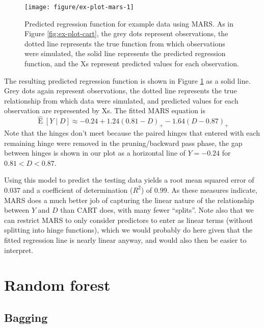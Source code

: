 \documentclass[12pt]{article}
\begin{document}
\begin{figure}[!htbp]

{\centering \texttt{[image: figure/ex-plot-mars-1]} 

}

\caption{Predicted regression function for example data using MARS. As in Figure \ref{fig:ex-plot-cart}, the grey dots represent observations, the dotted line represents the true function from which observations were simulated, the solid line represents the predicted regression function, and the Xs represent predicted values for each observation.}\label{fig:ex-plot-mars}
\end{figure}


The resulting predicted regression function is shown in Figure \ref{fig:ex-plot-mars} as a solid line. Grey dots again represent observations, the dotted line represents the true relationship from which data were simulated, and predicted values for each observation are represented by Xs. The fitted MARS equation is
\begin{equation}
  \label{eq:mars-eqn}
  \hat{\operatorname{E}}[Y \mid D] \approx -0.24 + 1.24 (0.81 - D)_{+} -1.64 (D - 0.87)_{+}
\end{equation}
Note that the hinges don't meet because the paired hinges that entered with each remaining hinge were removed in the pruning/backward pass phase, the gap between hinges is shown in our plot as a horizontal line of $Y = -0.24$ for $0.81 < D < 0.87$.

Using this model to predict the testing data yields a root mean squared error of 0.037 and a coefficient of determination ($R^2$) of 0.99. As these measures indicate, MARS does a much better job of capturing the linear nature of the relationship between $Y$ and $D$ than CART does, with many fewer ``splits''. Note also that we can restrict MARS to only consider predictors to enter as linear terms (without splitting into hinge functions), which we would probably do here given that the fitted regression line is nearly linear anyway, and would also then be easier to interpret.



\section{Random forest} %
\label{sec:random_forest}

\subsection{Bagging} %
\label{sub:bagging}
\end{document}

